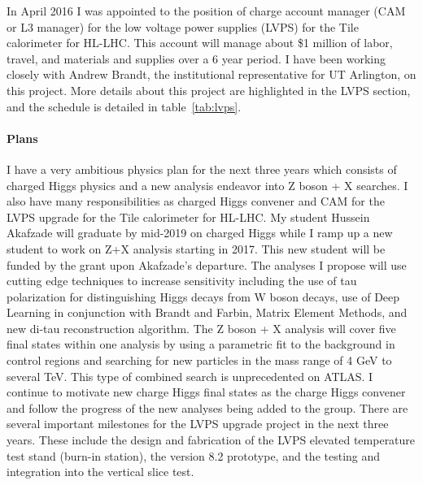 In April 2016 I was appointed to the position of charge account manager (CAM or L3 manager) for the low voltage power supplies (LVPS) for the Tile calorimeter for HL-LHC.  This account will manage about \$1 million 
of labor, travel, and materials and supplies over a 6 year period.  
I have been working closely with Andrew Brandt, the institutional representative for UT Arlington, on this project.
More details about this project are highlighted in the LVPS section, and the schedule is detailed in table~\ref{tab:lvps}.
\paragraph{Plans}
I have a very ambitious physics plan for the next three years which consists of charged Higgs physics and a new analysis endeavor into Z boson + X searches.  I also have many responsibilities as
charged Higgs convener and CAM for the LVPS upgrade for the Tile calorimeter for HL-LHC.  My student Hussein Akafzade will graduate by mid-2019 on charged Higgs while I ramp up a new student to work on
Z+X analysis starting in 2017. This new student will be funded by the grant upon Akafzade's departure.  The analyses I propose will use cutting edge techniques to increase sensitivity including the use
of tau polarization for distinguishing Higgs decays from W boson decays, use of Deep Learning in conjunction with Brandt and Farbin, Matrix Element Methods, and new di-tau reconstruction algorithm.  
The Z boson + X analysis will cover five final states within one analysis by using a parametric fit to the background in control regions and searching for new particles in the mass range of 4 GeV to several TeV.  This type of combined
search is unprecedented on ATLAS.
I continue to motivate new charge Higgs final states as the charge Higgs convener and follow the progress of the new analyses being added to the group. There are several important milestones for the LVPS upgrade project
in the next three years.  These include the design and fabrication of the LVPS elevated temperature test stand (burn-in station), the version 8.2 prototype, and the testing and integration into the vertical 
slice test.

